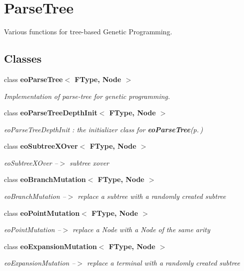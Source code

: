 \section{Parse\-Tree}
\label{group___parse_tree}
Various functions for tree-based Genetic Programming.  
\subsection*{Classes}
\begin{CompactItemize}
\item 
class {\bf eo\-Parse\-Tree$<$ FType, Node $>$}
\begin{CompactList}\small\item\em Implementation of parse-tree for genetic programming. \item\end{CompactList}\item 
class {\bf eo\-Parse\-Tree\-Depth\-Init$<$ FType, Node $>$}
\begin{CompactList}\small\item\em eo\-Parse\-Tree\-Depth\-Init : the initializer class for {\bf eo\-Parse\-Tree}{\rm (p.\,\pageref{classeo_parse_tree})} \item\end{CompactList}\item 
class {\bf eo\-Subtree\-XOver$<$ FType, Node $>$}
\begin{CompactList}\small\item\em eo\-Subtree\-XOver --$>$ subtree xover \item\end{CompactList}\item 
class {\bf eo\-Branch\-Mutation$<$ FType, Node $>$}
\begin{CompactList}\small\item\em eo\-Branch\-Mutation --$>$ replace a subtree with a randomly created subtree \item\end{CompactList}\item 
class {\bf eo\-Point\-Mutation$<$ FType, Node $>$}
\begin{CompactList}\small\item\em eo\-Point\-Mutation --$>$ replace a Node with a Node of the same arity \item\end{CompactList}\item 
class {\bf eo\-Expansion\-Mutation$<$ FType, Node $>$}
\begin{CompactList}\small\item\em eo\-Expansion\-Mutation --$>$ replace a terminal with a randomly created subtree \item\end{CompactList}\item 

\end{CompactItemize}
